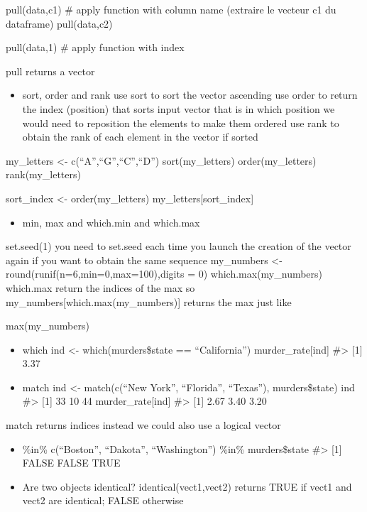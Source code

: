 \documentclass[
]{book}
\providecommand{\tightlist}{%
  \setlength{\itemsep}{0pt}\setlength{\parskip}{0pt}}
\begin{document}
pull(data,c1) \# apply function with column name (extraire le vecteur c1 du dataframe)
pull(data,c2)

pull(data,1) \# apply function with index

pull returns a vector

\begin{itemize}
\tightlist
\item
  sort, order and rank
  use sort to sort the vector ascending
  use order to return the index (position) that sorts input vector that is in which position we would need to reposition the elements to make them ordered
  use rank to obtain the rank of each element in the vector if sorted
\end{itemize}

my\_letters \textless- c(``A'',``G'',``C'',``D'')
sort(my\_letters)
order(my\_letters)
rank(my\_letters)

sort\_index \textless- order(my\_letters)
my\_letters{[}sort\_index{]}

\begin{itemize}
\tightlist
\item
  min, max and which.min and which.max
\end{itemize}

set.seed(1)
you need to set.seed each time you launch the creation
of the vector again if you want to obtain the same sequence
my\_numbers \textless- round(runif(n=6,min=0,max=100),digits = 0)
which.max(my\_numbers)
which.max return the indices of the max
so
my\_numbers{[}which.max(my\_numbers){]}
returns the max
just like

max(my\_numbers)

\begin{itemize}
\item
  which
  ind \textless- which(murders\$state == ``California'')
  murder\_rate{[}ind{]}
  \#\textgreater{} {[}1{]} 3.37
\item
  match
  ind \textless- match(c(``New York'', ``Florida'', ``Texas''), murders\$state)
  ind
  \#\textgreater{} {[}1{]} 33 10 44
  murder\_rate{[}ind{]}
  \#\textgreater{} {[}1{]} 2.67 3.40 3.20
\end{itemize}

match returns indices
instead we could also use a logical vector

\begin{itemize}
\item
  \%in\%
  c(``Boston'', ``Dakota'', ``Washington'') \%in\% murders\$state
  \#\textgreater{} {[}1{]} FALSE FALSE TRUE
\item
  Are two objects identical?
  identical(vect1,vect2)
  returns TRUE if vect1 and vect2 are identical; FALSE otherwise
\end{itemize}
\end{document}
